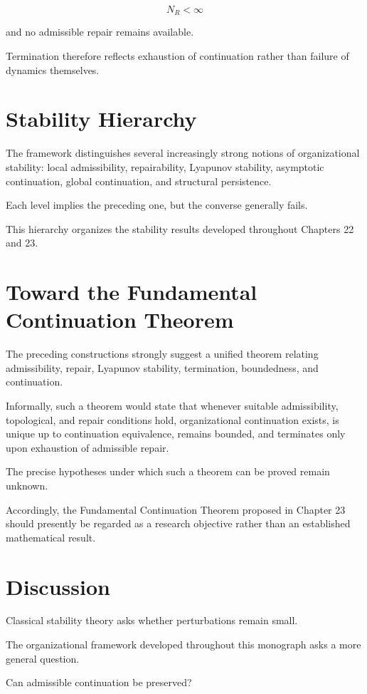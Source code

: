 \documentclass[11pt,oneside]{book}
\numberwithin{equation}{chapter}
\theoremstyle{definition}
\theoremstyle{plain}
\begin{document}
\[
N_R
<
\infty
\]

and no admissible repair remains available.

Termination therefore reflects exhaustion of continuation rather than
failure of dynamics themselves.

\section{Stability Hierarchy}

The framework distinguishes several increasingly strong notions of
organizational stability: local admissibility, repairability, Lyapunov
stability, asymptotic continuation, global continuation, and structural
persistence.

Each level implies the preceding one, but the converse generally fails.

This hierarchy organizes the stability results developed throughout
Chapters 22 and 23.

\section{Toward the Fundamental Continuation Theorem}

The preceding constructions strongly suggest a unified theorem relating
admissibility, repair, Lyapunov stability, termination, boundedness, and
continuation.

Informally, such a theorem would state that whenever suitable
admissibility, topological, and repair conditions hold, organizational
continuation exists, is unique up to continuation equivalence, remains
bounded, and terminates only upon exhaustion of admissible repair.

The precise hypotheses under which such a theorem can be proved remain
unknown.

Accordingly, the Fundamental Continuation Theorem proposed in Chapter 23
should presently be regarded as a research objective rather than an
established mathematical result.

\section{Discussion}

Classical stability theory asks whether perturbations remain small.

The organizational framework developed throughout this monograph asks a
more general question.

Can admissible continuation be preserved?
\end{document}
